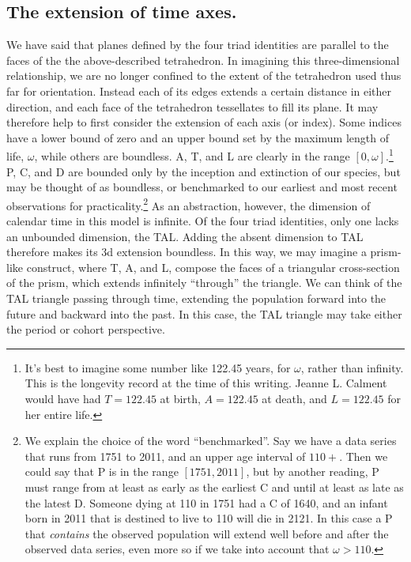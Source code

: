 \documentclass[12pt,oneside,a4paper]{article} %
\begin{document}
\subsection{The extension of time axes.}
We have said that planes defined by the four triad identities are parallel to
the faces of the the above-described tetrahedron. In imagining this three-dimensional
relationship, we are no longer confined to the extent of the tetrahedron used thus far for orientation. Instead each of its edges extends a
certain distance in either direction, and each face of the tetrahedron
tessellates to fill its plane.
It may therefore help to first consider the extension of each axis (or index).
Some indices have a lower bound of zero and an upper bound set by the maximum
length of life, $\omega$, while others are boundless. A, T, and L
are clearly in the range $[0,\omega]$.\footnote{It's best to imagine some number like 122.45 years, for $\omega$, rather than infinity. This is the longevity record at the time of this writing. Jeanne L. Calment would have had
$T=122.45$ at birth, $A = 122.45$ at death, and $L=122.45$ for
her entire life.} P, C, and D are bounded only by the inception and extinction of
our species, but may be thought of as boundless, or benchmarked
to our earliest and most recent observations for practicality.\footnote{We
explain the choice of the word ``benchmarked''. Say we have a data series that runs from 1751 to 2011, and an upper age
interval of $110+$. Then we could say that P is in the range $[1751,2011]$,
but by another reading, P must range from at least as early as the earliest
C and until at least as late as the latest D. Someone dying at 110 in 1751
had a C of 1640, and an infant born in 2011 that is destined to live to 110
will die in 2121. In this case a P that \textit{contains} the observed
population will extend well before and after the observed data series, even
more so if we take into account that $\omega > 110$.} As an abstraction,
however, the dimension of calendar time in this model is infinite. Of the four
triad identities, only one lacks an unbounded dimension, the TAL. Adding
the absent dimension to TAL therefore makes its 3d extension boundless. In
this way, we may imagine a prism-like construct, where T, A, and L, compose
the faces of a triangular cross-section of the prism, which extends infinitely
``through'' the triangle.
We can think of the TAL triangle passing through time, extending the population
forward into the future and backward into the past. In this case, the TAL
triangle may take either the period or cohort perspective. 
\end{document}
